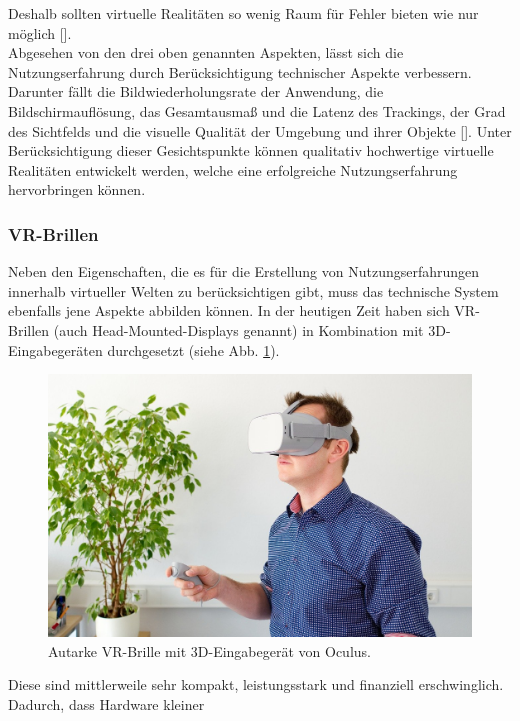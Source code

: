 \documentclass[a4paper,12pt,oneside]{article}
\begin{document}
        Deshalb 
        sollten virtuelle Realitäten so wenig Raum für Fehler bieten wie nur 
        möglich [\cite{Slater2009}]. \\
        Abgesehen von den drei oben genannten Aspekten, lässt sich die Nutzungserfahrung durch
        Berücksichtigung technischer Aspekte verbessern. Darunter fällt die
        Bildwiederholungsrate der Anwendung, die Bildschirmauflösung, das Gesamtausmaß und
        die Latenz des Trackings, der Grad des Sichtfelds und die visuelle Qualität der Umgebung
        und ihrer Objekte [\cite{Slater2009}].
        Unter Berücksichtigung dieser Gesichtspunkte können qualitativ hochwertige
        virtuelle Realitäten entwickelt werden, welche eine erfolgreiche 
        Nutzungserfahrung hervorbringen können.
      \subsubsection{VR-Brillen}
        Neben den Eigenschaften, die es für die Erstellung von
        Nutzungserfahrungen innerhalb virtueller Welten zu berücksichtigen gibt, 
        muss das technische System ebenfalls jene Aspekte
        abbilden können. In der heutigen Zeit haben sich VR-Brillen 
        (auch Head-Mounted-Displays genannt) in 
        Kombination mit 3D-Eingabegeräten durchgesetzt
        (siehe Abb. \ref{fig:vr-brille}).
        \begin{figure}[t]
          \centering
          \includegraphics[scale=0.3]{img/vr-brille.jpg}
          \caption{Autarke VR-Brille mit 3D-Eingabegerät von Oculus.}
          \label{fig:vr-brille}
        \end{figure}
        Diese sind mittlerweile sehr kompakt,
        leistungsstark und finanziell erschwinglich. Dadurch, dass Hardware kleiner
\end{document}
